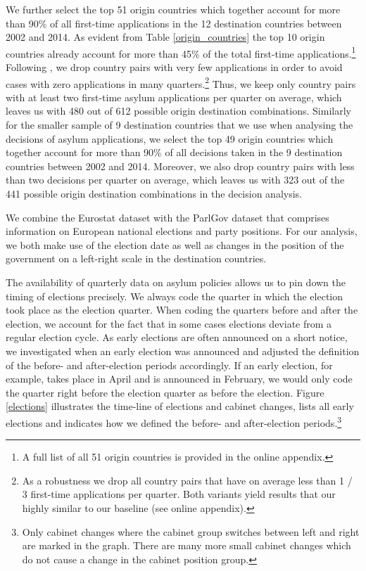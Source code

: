 \documentclass[a4paper,12pt]{article}
\begin{document}
We further select the top 51 origin countries which together account for more than 90\% of all first-time applications in the 12 destination countries between 2002 and 2014. As evident from Table \ref{origin_countries} the top 10 origin countries already account for more than 45\% of the total first-time applications.\footnote{A full list of all 51 origin countries is provided in the online appendix.} Following \cite{hatton2016}, we drop country pairs with very few applications in order to avoid cases with zero applications in many quarters.\footnote{As a  robustness we drop all country pairs that have on average less than 1 / 3 first-time applications per quarter. Both variants yield results that our highly similar to our baseline (see online appendix).} Thus, we keep only country pairs with at least two first-time asylum applications per quarter on average, which leaves us with 480 out of 612 possible origin destination combinations. Similarly for the smaller sample of 9 destination countries that we use when analysing the decisions of asylum applications, we select the top 49 origin countries which together account for more than 90\% of all decisions taken in the 9 destination countries between 2002 and 2014. Moreover, we also drop country pairs with less than two decisions per quarter on average, which leaves us with 323 out of the 441 possible origin destination combinations in the decision analysis.



We combine the Eurostat dataset with the ParlGov dataset that comprises information on European national elections and party positions. For our analysis, we both make use of the election date as well as changes in the position of the government on a left-right scale in the destination countries. 

  

The availability of quarterly data on asylum policies allows us to pin down the timing of elections precisely. We always code the quarter in which the election took place as the election quarter. When coding the quarters before and after the election, we account for the fact that in some cases elections deviate from a regular election cycle. As early elections are often announced on a short notice, we investigated when an early election was announced and adjusted the definition of the before- and after-election periods accordingly. If an early election, for example, takes place in April and is announced in February, we would only code the quarter right before the election quarter as before the election. 
Figure \ref{elections} illustrates the time-line of elections and cabinet changes, lists all early elections and indicates how we defined the before- and after-election periods.\footnote{Only cabinet changes where the cabinet group switches between left and right are marked in the graph. There are many more small cabinet changes which do not cause a change in the cabinet position group.}
\end{document}
